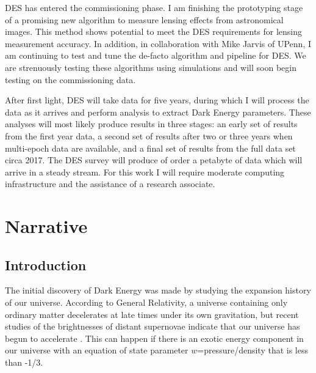 \documentclass[12pt]{article}
\begin{document}
DES has entered the commissioning phase.  I am finishing the prototyping stage
of a promising new algorithm to measure lensing effects from astronomical
images.  This method shows potential to meet the DES requirements for lensing
measurement accuracy. In addition, in collaboration with Mike Jarvis of UPenn,
I am continuing to test and tune the de-facto algorithm and pipeline for DES.
We are strenuously testing these algorithms using simulations and will soon
begin testing on the commissioning data.

After first light, DES will take data for five years, during which I will
process the data as it arrives and perform analysis to extract Dark Energy
parameters.  These analyses will most likely produce results in three stages:
an early set of results from the first year data, a second set of results after
two or three years when multi-epoch data are available, and a final set of
results from the full data set circa 2017.  The DES survey will produce of
order a petabyte of data which will arrive in a steady stream.  For this work I
will require moderate computing infrastructure and the assistance of a research
associate.


\newpage
{}
\section*{Narrative}
\setcounter{section}{1}
\subsection{Introduction}

The initial discovery of Dark Energy was made by studying the expansion history
of our universe.  According to General Relativity, a universe containing only
ordinary matter decelerates at late times under its own gravitation, but recent
studies of the brightnesses of distant supernovae indicate that our universe
has begun to accelerate \cite{Riess98,Perlmutter99}.  This can happen if there
is an exotic energy component in our universe with an equation of state
parameter $w$=pressure/density that is less than -1/3.
\end{document}
